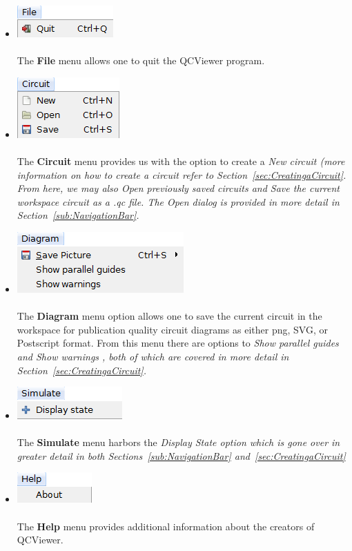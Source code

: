 \documentclass[10pt]{article}
\theoremstyle{definition}
\begin{document}
\begin{itemize}
\item \includegraphics{Figures/Menu/File.png} \\ \\
The {\bf File} menu allows one to quit the QCViewer program.

\item \includegraphics{Figures/Menu/Circuit.png} \\ \\
The {\bf Circuit} menu provides us with the option to create a \em New \em circuit (more information on how to create a circuit refer to  Section~\ref{sec:CreatingaCircuit}. From here, we may also \em Open \em previously saved circuits and \em Save \em the current workspace circuit as a .qc file. The \em Open \em dialog is provided in more detail in Section~\ref{sub:NavigationBar}.

\item \includegraphics{Figures/Menu/Diagram.png} \\ \\ 
The {\bf Diagram} menu option allows one to save the current circuit in the workspace for publication quality circuit diagrams as either png, SVG, or Postscript format. From this menu there are options to \em Show parallel guides \em and \em Show warnings \em, both of which are covered in more detail in Section~\ref{sec:CreatingaCircuit}.
 
\item \includegraphics{Figures/Menu/Simulate.png} \\ \\
The {\bf Simulate} menu harbors the \em Display State \em option which is gone over in greater detail in both Sections~\ref{sub:NavigationBar} and~\ref{sec:CreatingaCircuit}


\item \includegraphics{Figures/Menu/Help.png} \\ \\
The {\bf Help} menu provides additional information about the creators of QCViewer. 

\end{itemize}
\end{document}
